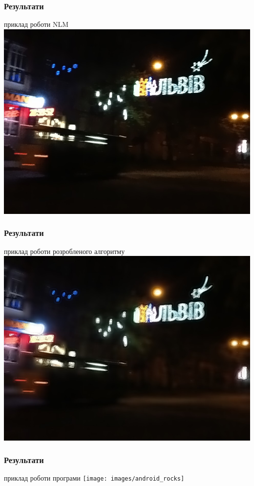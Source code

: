 \documentclass[12pt]{beamer}
\begin{document}
\begin{frame}\frametitle{ Результати}
	приклад роботи NLM
	\includegraphics[scale=0.3]{images/lviv_nlm}
\end{frame}
\begin{frame}\frametitle{ Результати}
	приклад роботи розробленого алгоритму
	\includegraphics[scale=0.3]{images/lviv_mine}
\end{frame}
\begin{frame}\frametitle{ Результати}
	приклад роботи програми
	\texttt{[image: images/android\_rocks]}
\end{frame}
\end{document}
